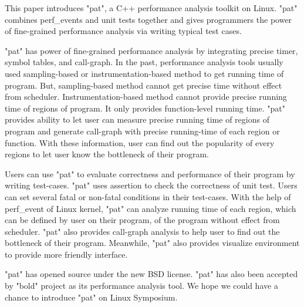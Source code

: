 This paper introduces "pat", a C++ performance analysis toolkit on Linux.
"pat" combines perf_events and unit tests together and gives programmers the power of fine-grained performance analysis via writing typical test cases.

"pat" has power of fine-grained performance analysis by integrating precise timer, symbol tables, and call-graph.
In the past, performance analysis tools usually used sampling-based or instrumentation-based method to get running time of program. But, sampling-based method cannot get precise time without effect from scheduler. Instrumentation-based method cannot provide precise running time of regions of program. It only provides function-level running time. 
"pat" provides ability to let user can measure precise running time of regions of program and generate call-graph with precise running-time of each region or function. 
With these information, user can find out the popularity of every regions to let user know the bottleneck of their program.

Users can use "pat" to evaluate correctness and performance of their program by writing test-cases.
"pat" uses assertion to check the correctness of unit test. 
Users can set several fatal or non-fatal conditions in their test-cases.
With the help of perf_event of Linux kernel, "pat" can analyze running time of each region, which can be defined by user on their program, of the program without effect from scheduler. 
"pat" also provides call-graph analysis to help user to find out the bottleneck of their program. 
Meanwhile, "pat" also provides visualize environment to provide more friendly interface.

"pat" has opened source under the new BSD license. 
"pat" has also been accepted by "bold" project as its performance analysis tool.
We hope we could have a chance to introduce "pat" on Linux Symposium.
